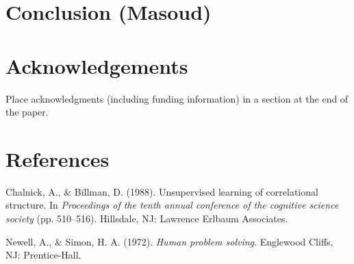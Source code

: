 \documentclass[10pt, letterpaper]{article}
\begin{document}
\section{Conclusion (Masoud)}\label{conclusion-masoud}

\section{Acknowledgements}\label{acknowledgements}

Place acknowledgments (including funding information) in a section at
the end of the paper.

\section{References}\label{references}

\setlength{\parindent}{-0.1in} \setlength{\leftskip}{0.125in} \noindent

\hypertarget{refs}{}
\hypertarget{ref-ChalnickBillman1988a}{}
Chalnick, A., \& Billman, D. (1988). Unsupervised learning of
correlational structure. In \emph{Proceedings of the tenth annual
conference of the cognitive science society} (pp. 510--516). Hillsdale,
NJ: Lawrence Erlbaum Associates.

\hypertarget{ref-NewellSimon1972a}{}
Newell, A., \& Simon, H. A. (1972). \emph{Human problem solving}.
Englewood Cliffs, NJ: Prentice-Hall.
\end{document}
